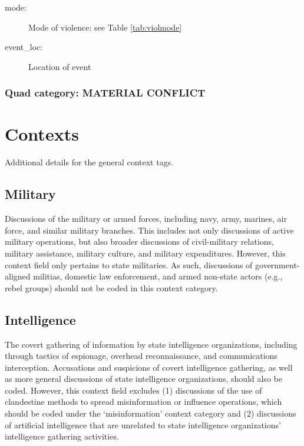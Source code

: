 \documentclass[11pt]{report}
\begin{document}
\begin{description}
	\item[mode:] Mode of violence: see Table \ref{tab:violmode}
	\item[event\_loc:] Location of event
\end{description}


\subsection{Quad category: MATERIAL CONFLICT}


\chapter{Contexts}\label{chapter:contexts}

Additional details for the general context tags.

\section{Military}\label{context:military}

Discussions of the military or armed forces, including navy, army, marines, air force, and similar military branches. This includes not only discussions of active military operations, but also broader discussions of civil-military relations, military assistance, military culture, and military expenditures. However, this context field only pertains to state militaries. As such, discussions of government-aligned militias, domestic law enforcement, and armed non-state actors (e.g., rebel groups) should not be coded in this context category.


\section{Intelligence}\label{context:intelligence}

The covert gathering of information by state intelligence organizations, including through tactics of espionage, overhead reconnaissance, and communications interception. Accusations and suspicions of covert intelligence gathering, as well as more general discussions of state intelligence organizations, should also be coded. However, this context field excludes (1) discussions of the use of clandestine methods to spread misinformation or influence operations, which should be coded under the `misinformation' context category and (2) discussions of artificial intelligence that are unrelated to state intelligence organizations' intelligence gathering activities.
\end{document}
